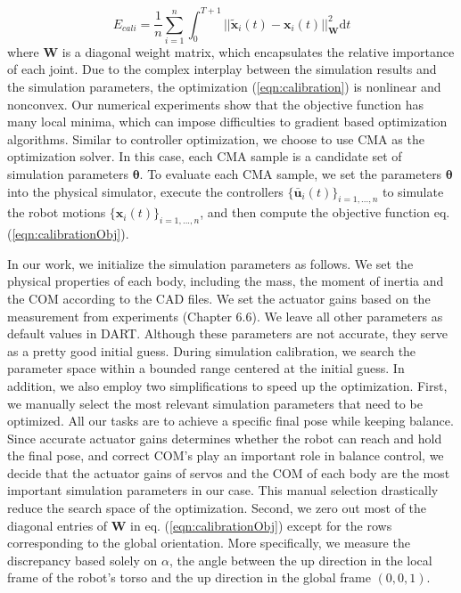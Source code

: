 \begin{equation}
  E_{cali}=\frac{1}{n}\sum_{i=1}^{n}\int_{0}^{T+1}||\tilde{\mathbf{x}}_i(t)-\mathbf{x}_i(t)||_{\mathbf{W}}^2\mathrm{d}t
  \label{eqn:calibrationObj}
\end{equation}
where $\mathbf{W}$ is a diagonal weight matrix, which encapsulates the relative importance of each joint. Due to the complex interplay between the simulation results and the simulation parameters, the optimization (\ref{eqn:calibration}) is nonlinear and nonconvex.  Our numerical experiments show that the objective function has many local minima, which can impose difficulties to gradient based optimization algorithms. Similar to controller optimization, we choose to use CMA as the optimization solver. In this case, each CMA sample is a candidate set of simulation parameters $\mathbf{\theta}$. To evaluate each CMA sample, we set the parameters $\mathbf{\theta}$ into the physical simulator, execute the controllers $\{\bar{\mathbf{u}}_i(t)\}_{i=1,...,n}$ to simulate the robot motions $\{\mathbf{x}_i(t)\}_{i=1,...,n}$, and then compute the objective function eq. (\ref{eqn:calibrationObj}).

In our work, we initialize the simulation parameters as follows. We set the physical properties of each body, including the mass, the moment of inertia and the COM according to the CAD files. We set the actuator gains based on the measurement from experiments (Chapter 6.6). We leave all other parameters as default values in DART. Although these parameters are not accurate, they serve as a pretty good initial guess. During simulation calibration, we search the parameter space within a bounded range centered at the initial guess. In addition, we also employ two simplifications to speed up the optimization. First, we manually select the most relevant simulation parameters that need to be optimized. All our tasks are to achieve a specific final pose while keeping balance. Since accurate actuator gains determines whether the robot can reach and hold the final pose, and correct COM's play an important role in balance control, we decide that the actuator gains of servos and the COM of each body are the most important simulation parameters in our case. This manual selection drastically reduce the search space of the optimization. Second, we zero out most of the diagonal entries of $\mathbf{W}$ in eq. (\ref{eqn:calibrationObj}) except for the rows corresponding to the global orientation. More specifically, we measure the discrepancy based solely on $\alpha$, the angle between the up direction in the local frame of the robot's torso and the up direction in the global frame $(0,0,1)$.

